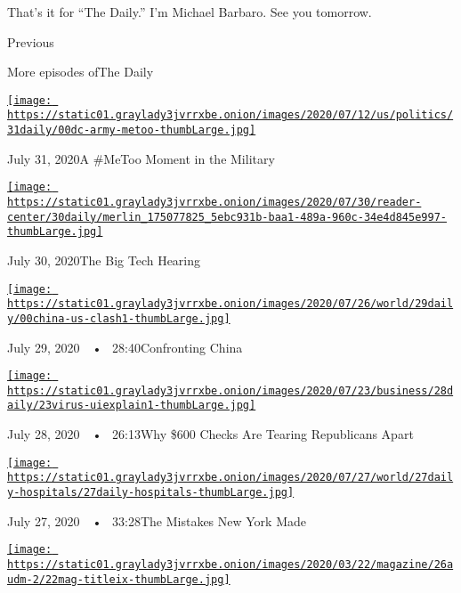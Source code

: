 That's it for ``The Daily.'' I'm Michael Barbaro. See you tomorrow.

Previous

More episodes ofThe Daily

\href{https://www.nytimes3xbfgragh.onion/2020/07/31/podcasts/the-daily/vanessa-guillen-military-metoo.html?action=click\&module=audio-series-bar\&region=header\&pgtype=Article}{\texttt{[image: https://static01.graylady3jvrrxbe.onion/images/2020/07/12/us/politics/31daily/00dc-army-metoo-thumbLarge.jpg]}}

July 31, 2020A \#MeToo Moment in the Military

\href{https://www.nytimes3xbfgragh.onion/2020/07/30/podcasts/the-daily/congress-facebook-amazon-google-apple.html?action=click\&module=audio-series-bar\&region=header\&pgtype=Article}{\texttt{[image: https://static01.graylady3jvrrxbe.onion/images/2020/07/30/reader-center/30daily/merlin\_175077825\_5ebc931b-baa1-489a-960c-34e4d845e997-thumbLarge.jpg]}}

July 30, 2020The Big Tech Hearing

\href{https://www.nytimes3xbfgragh.onion/2020/07/29/podcasts/the-daily/china-trump-foreign-policy.html?action=click\&module=audio-series-bar\&region=header\&pgtype=Article}{\texttt{[image: https://static01.graylady3jvrrxbe.onion/images/2020/07/26/world/29daily/00china-us-clash1-thumbLarge.jpg]}}

July 29, 2020~~•~ 28:40Confronting China

\href{https://www.nytimes3xbfgragh.onion/2020/07/28/podcasts/the-daily/unemployment-benefits-coronavirus.html?action=click\&module=audio-series-bar\&region=header\&pgtype=Article}{\texttt{[image: https://static01.graylady3jvrrxbe.onion/images/2020/07/23/business/28daily/23virus-uiexplain1-thumbLarge.jpg]}}

July 28, 2020~~•~ 26:13Why \$600 Checks Are Tearing Republicans Apart

\href{https://www.nytimes3xbfgragh.onion/2020/07/27/podcasts/the-daily/new-york-hospitals-covid.html?action=click\&module=audio-series-bar\&region=header\&pgtype=Article}{\texttt{[image: https://static01.graylady3jvrrxbe.onion/images/2020/07/27/world/27daily-hospitals/27daily-hospitals-thumbLarge.jpg]}}

July 27, 2020~~•~ 33:28The Mistakes New York Made

\href{https://www.nytimes3xbfgragh.onion/2020/07/26/podcasts/the-daily/the-accusation-the-sunday-read.html?action=click\&module=audio-series-bar\&region=header\&pgtype=Article}{\texttt{[image: https://static01.graylady3jvrrxbe.onion/images/2020/03/22/magazine/26audm-2/22mag-titleix-thumbLarge.jpg]}}

